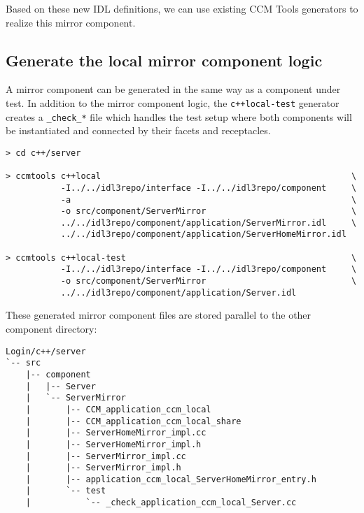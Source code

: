 Based on these new IDL definitions, we can use existing CCM Tools generators to
realize this mirror component.


\subsection{Generate the local mirror component logic}
\label{subsection:GenerateLocalMirrorComponentLogicCxx}
A mirror component can be generated in the same way as a component under test.
In addition to the mirror component logic, the {\tt c++local-test} generator creates
a {\tt \_check\_*} file which handles the test setup where both components will be
instantiated and connected by their facets and receptacles.   

\begin{footnotesize}
\begin{verbatim}
> cd c++/server

> ccmtools c++local                                                  \
           -I../../idl3repo/interface -I../../idl3repo/component     \
           -a                                                        \
           -o src/component/ServerMirror                             \
           ../../idl3repo/component/application/ServerMirror.idl     \
           ../../idl3repo/component/application/ServerHomeMirror.idl

> ccmtools c++local-test                                             \
           -I../../idl3repo/interface -I../../idl3repo/component     \
           -o src/component/ServerMirror                             \
           ../../idl3repo/component/application/Server.idl           
\end{verbatim}
\end{footnotesize}

These generated mirror component files are stored parallel to the other 
component directory:
\begin{footnotesize}
\begin{verbatim}
Login/c++/server
`-- src
    |-- component
    |   |-- Server
    |   `-- ServerMirror
    |       |-- CCM_application_ccm_local
    |       |-- CCM_application_ccm_local_share
    |       |-- ServerHomeMirror_impl.cc
    |       |-- ServerHomeMirror_impl.h
    |       |-- ServerMirror_impl.cc
    |       |-- ServerMirror_impl.h
    |       |-- application_ccm_local_ServerHomeMirror_entry.h
    |       `-- test
    |           `-- _check_application_ccm_local_Server.cc
\end{verbatim}
\end{footnotesize}



